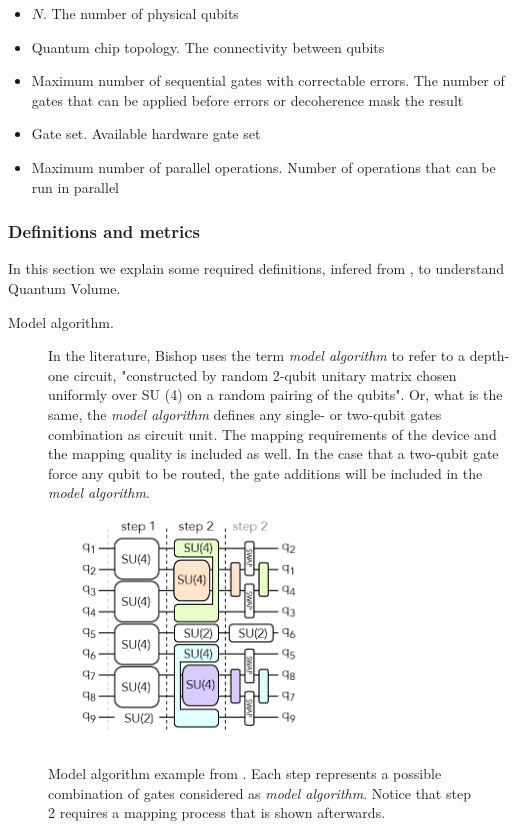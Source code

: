 \documentclass[11pt]{article}
\begin{document}
\begin{itemize}
\item \(N\). The number of physical qubits
\item Quantum chip topology. The connectivity between qubits
\item Maximum number of sequential gates with correctable errors. The number of gates that can be applied before errors or decoherence mask the result
\item Gate set. Available hardware gate set
\item Maximum number of parallel operations. Number of operations that can be run in parallel
\end{itemize}

\subsubsection{Definitions and metrics}
\label{sec:org55d4c58}

In this section we explain some required definitions, infered from \cite{Bishop_2017,Moll_2018}, to understand Quantum Volume.


\begin{description}
\item[{Model algorithm.}] In the literature, Bishop uses the term \emph{model algorithm} \cite{Bishop_2017} to refer to a depth-one circuit, "constructed by random 2-qubit unitary matrix chosen uniformly over SU (4) on a random pairing of the qubits". Or, what is the same, the \emph{model algorithm} defines any single- or two-qubit gates combination as circuit unit. The mapping requirements of the device and the mapping quality is included as well. In the case that a two-qubit gate force any qubit to be routed, the gate additions will be included in the \emph{model algorithm}.
\end{description}

\begin{figure}[htbp]
\centering
\includegraphics[width=0.7\textwidth]{model_algorithm.png}
\caption{\label{fig:org6e03625}
Model algorithm example from \cite{Moll_2018}. Each step represents a possible combination of gates considered as \emph{model algorithm}. Notice that step 2 requires a mapping process that is shown afterwards.}
\end{figure}
\end{document}
